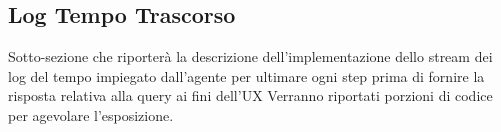 \subsection{Log Tempo Trascorso}

Sotto-sezione che riporterà la descrizione dell'implementazione dello stream dei log del tempo impiegato dall'agente per ultimare ogni step prima di fornire la risposta relativa alla query ai fini dell'UX
Verranno riportati porzioni di codice per agevolare l'esposizione.